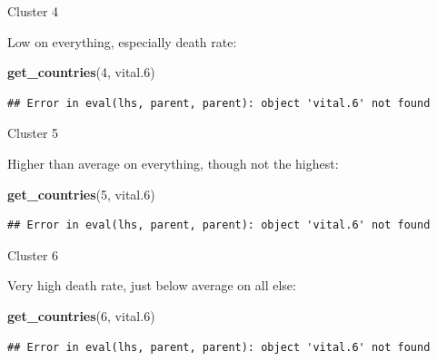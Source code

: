 \documentclass[ignorenonframetext,]{beamer}
\newenvironment{Shaded}{\begin{snugshade}}{\end{snugshade}}
\newcommand{\DecValTok}[1]{\textcolor[rgb]{0.00,0.00,0.81}{#1}}
\newcommand{\FloatTok}[1]{\textcolor[rgb]{0.00,0.00,0.81}{#1}}
\newcommand{\KeywordTok}[1]{\textcolor[rgb]{0.13,0.29,0.53}{\textbf{#1}}}
\newcommand{\NormalTok}[1]{#1}
\begin{document}
\begin{frame}[fragile]{Cluster 4}
\protect\hypertarget{cluster-4}{}

Low on everything, especially death rate:

\begin{Shaded}
\begin{Highlighting}[]
\KeywordTok{get_countries}\NormalTok{(}\DecValTok{4}\NormalTok{, vital}\FloatTok{.6}\NormalTok{)}
\end{Highlighting}
\end{Shaded}

\begin{verbatim}
## Error in eval(lhs, parent, parent): object 'vital.6' not found
\end{verbatim}

\end{frame}

\begin{frame}[fragile]{Cluster 5}
\protect\hypertarget{cluster-5}{}

Higher than average on everything, though not the highest:

\begin{Shaded}
\begin{Highlighting}[]
\KeywordTok{get_countries}\NormalTok{(}\DecValTok{5}\NormalTok{, vital}\FloatTok{.6}\NormalTok{)}
\end{Highlighting}
\end{Shaded}

\begin{verbatim}
## Error in eval(lhs, parent, parent): object 'vital.6' not found
\end{verbatim}

\end{frame}

\begin{frame}[fragile]{Cluster 6}
\protect\hypertarget{cluster-6}{}

Very high death rate, just below average on all else:

\begin{Shaded}
\begin{Highlighting}[]
\KeywordTok{get_countries}\NormalTok{(}\DecValTok{6}\NormalTok{, vital}\FloatTok{.6}\NormalTok{)}
\end{Highlighting}
\end{Shaded}

\begin{verbatim}
## Error in eval(lhs, parent, parent): object 'vital.6' not found
\end{verbatim}

\end{frame}
\end{document}
